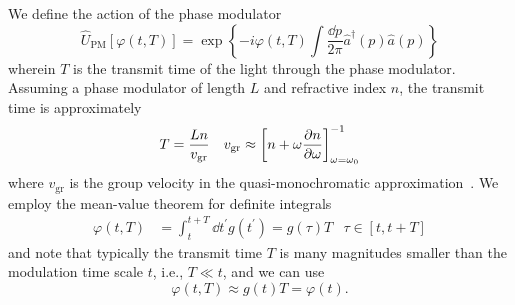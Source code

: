 We define the action of the phase modulator
\begin{equation}
	\hat{U}_\text{PM}\left[\varphi(t,T)\right]
	=
	\exp\left\{
		-i\varphi(t,T)
		\int\frac{\dd{p}}{2\pi}
		\hat{a}^\dagger(p)
		\hat{a}(p)
	\right\}
\end{equation}
wherein $T$ is the transmit time of the light through the phase modulator.
Assuming a phase modulator of length $L$ and refractive index $n$, the transmit time is approximately
\begin{align}
	T
	&=
	\frac{Ln}{v_\text{gr}}
	&
	v_\text{gr}
	\approx
	\left[
		n
		+
		\omega
		\pdv{n}{\omega}
	\right]_{\omega=\omega_0}^{-1}
\end{align}
where $v_\text{gr}$ is the group velocity in the quasi-monochromatic approximation~\cite[p.~211]{Jackson2007}.
We employ the mean-value theorem for definite integrals
\begin{align}
	\varphi(t,T)
	&=
	\int_{t}^{t+T}\dd{t^\prime}
	g(t^\prime)
	=
	g(\tau)
	T
	&
	\tau\in[t,t+T]
\end{align}
and note that typically the transmit time $T$ is many magnitudes smaller than the modulation time scale $t$, i.e., $T\ll t$, and we can use
\begin{equation}
	\varphi(t,T)
	\approx
	g(t)
	T
	=
	\varphi(t)
	.
\end{equation}


